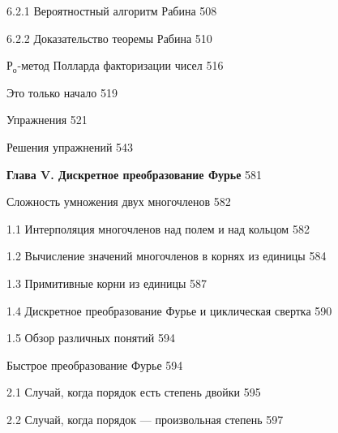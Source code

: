 \documentclass{mai_book}
\begin{document}
{6.2.1 Вероятностный алгоритм Рабина \dotfill \hspace{0.5cm} 508

6.2.2 Доказательство теоремы Рабина \dotfill \hspace{0.5cm} 510

Р$_{о}$-метод Полларда факторизации чисел \dotfill \hspace{0.5cm} 516
   
 \hspace{0.05cm} Это только начало \dotfill \hspace{0.5cm} 519 
   
\noindent Упражнения \dotfill \hspace{0.5cm} 521
   
\noindent Решения упражнений \dotfill \hspace{0.5cm} 543 \newline
    
\noindent \textbf{Глава V. Дискретное преобразование Фурье} \dotfill \hspace{0.5cm} 581

 \hspace{0.05cm} Сложность умножения двух многочленов \dotfill \hspace{0.5cm} 582

1.1 Интерполяция многочленов над полем и над кольцом \dotfill \hspace{0.5cm} 582

1.2 Вычисление значений многочленов в корнях из единицы \dotfill \hspace{0.5cm} 584

1.3 Примитивные корни из единицы \dotfill \hspace{0.5cm} 587

1.4 Дискретное преобразование Фурье и циклическая свертка \dotfill \hspace{0.5cm}  590

1.5 Обзор различных понятий \dotfill \hspace{0.5cm} 594

 \hspace{0.05cm} Быстрое преобразование Фурье \dotfill \hspace{0.5cm} 594

2.1 Случай, когда порядок есть степень двойки \dotfill \hspace{0.5cm} 595

2.2 Случай, когда порядок — произвольная степень \dotfill \hspace{0.5cm} 597

}
\end{document}
